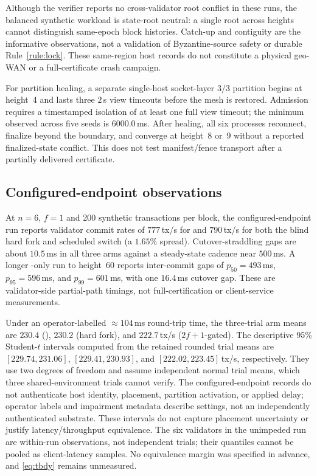 Although the verifier reports no cross-validator root conflict in these runs, the
balanced synthetic workload is state-root neutral: a single root across heights
cannot distinguish same-epoch block histories. Catch-up and contiguity are the
informative observations, not a validation of Byzantine-source safety or durable
Rule~\ref{rule:lock}. These same-region host records do not constitute a
physical geo-WAN or a full-certificate crash campaign.

For partition healing, a separate single-host socket-layer $3/3$ partition begins
at height~4 and lasts three $2$\,s view timeouts before the mesh is restored.
Admission requires a timestamped isolation of at least one full view timeout; the
minimum observed across five seeds is $6000.0$\,ms. After healing, all six processes
reconnect, finalize beyond the boundary, and converge at height~8 or~9 without a
reported finalized-state conflict. This does not test manifest/fence transport
after a partially delivered certificate.

\subsection{Configured-endpoint observations}
At $n=6$, $f=1$ and 200 synthetic transactions per block, the configured-endpoint
run reports validator commit rates of $777$\,tx/s for \sage{} and $790$\,tx/s
for both the blind hard fork and scheduled switch (a $1.65\%$ spread).
Cutover-straddling gaps are about $10.5$\,ms in all three arms against a
steady-state cadence near $500$\,ms. A longer \sage-only run to height~60
reports inter-commit gaps of $p_{50}=493$\,ms, $p_{95}=596$\,ms, and
$p_{99}=601$\,ms, with one $16.4$\,ms cutover gap. These are validator-side
partial-path timings, not full-certification or client-service measurements.

Under an operator-labelled $\approx104$\,ms round-trip time, the three-trial
arm means are $230.4$ (\sage), $230.2$ (hard fork), and $222.7$\,tx/s
($2f{+}1$-gated). The descriptive $95\%$ Student-$t$ intervals computed from
the retained rounded trial means are $[229.74,231.06]$, $[229.41,230.93]$,
and $[222.02,223.45]$\,tx/s, respectively. They use two degrees of freedom
and assume independent normal trial means, which three shared-environment trials
cannot verify. The configured-endpoint records do not authenticate host identity, placement,
partition activation, or applied delay; operator labels and impairment metadata describe settings,
not an independently authenticated substrate. These intervals do not capture placement
uncertainty or justify latency/throughput equivalence. The six validators in the
unimpeded run are within-run observations, not independent trials; their quantiles
cannot be pooled as client-latency samples. No equivalence margin was specified in
advance, and \eqref{eq:tbdy} remains unmeasured.


